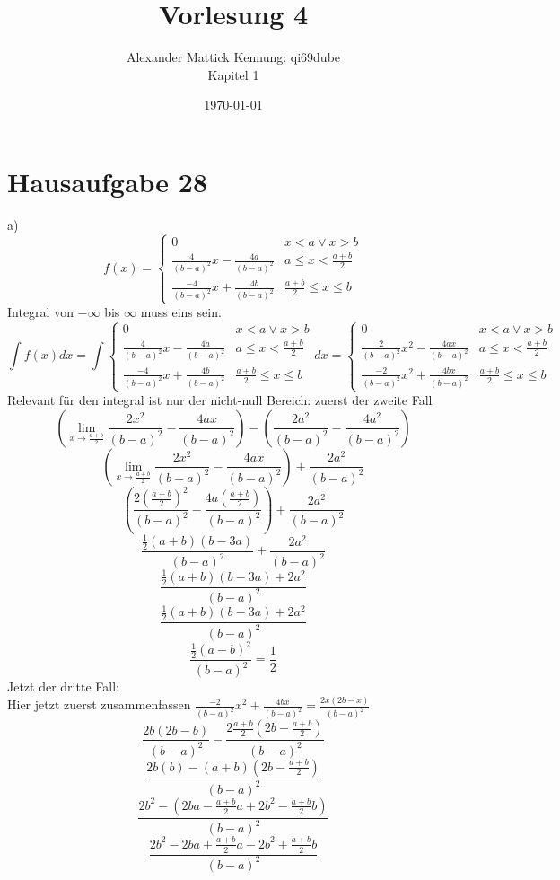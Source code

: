 \documentclass{article}
\author{
Alexander Mattick Kennung: qi69dube\\
Kapitel 1
}
\date{\today}
\title{Vorlesung 4}
\begin{document}
	\maketitle
	\section{Hausaufgabe 28}
	a)\\
	\[f(x)=\begin{cases}0&x<a\lor x>b\\\frac{4}{(b-a)^2}x-\frac{4a}{(b-a)^2}&a\leq x<\frac{a+b}{2}\\ \frac{-4}{(b-a)^2}x+\frac{4b}{(b-a)^2}&\frac{a+b}{2}\leq x\leq b\end{cases}\]
	Integral von $-\infty$ bis $\infty$ muss eins sein.\\
	\[\int f(x)dx = \int\begin{cases}0&x<a\lor x>b\\\frac{4}{(b-a)^2}x-\frac{4a}{(b-a)^2}&a\leq x<\frac{a+b}{2}\\ \frac{-4}{(b-a)^2}x+\frac{4b}{(b-a)^2}&\frac{a+b}{2}\leq x\leq b\end{cases} dx = \begin{cases}0&x<a\lor x>b\\\frac{2}{(b-a)^2}x^2-\frac{4ax}{(b-a)^2}&a\leq x<\frac{a+b}{2}\\ \frac{-2}{(b-a)^2}x^2+\frac{4bx}{(b-a)^2}&\frac{a+b}{2}\leq x\leq b\end{cases}\]
	Relevant für den integral ist nur der nicht-null Bereich: zuerst der zweite Fall\\
	$$(\lim\limits_{x\to\frac{a+b}{2}}\frac{2x^2}{(b-a)^2}-\frac{4ax}{(b-a)^2})-(\frac{2a^2}{(b-a)^2}-\frac{4a^2}{(b-a)^2})$$
	$$(\lim\limits_{x\to\frac{a+b}{2}}\frac{2x^2}{(b-a)^2}-\frac{4ax}{(b-a)^2})+\frac{2a^2}{(b-a)^2}$$
	$$(\frac{2(\frac{a+b}{2})^2}{(b-a)^2}-\frac{4a(\frac{a+b}{2})}{(b-a)^2})+\frac{2a^2}{(b-a)^2}$$
	$$\frac{\frac{1}{2}(a+b)(b-3a)}{(b-a)^2}+\frac{2a^2}{(b-a)^2}$$
	$$\frac{\frac{1}{2}(a+b)(b-3a)+2a^2}{(b-a)^2}$$
	$$\frac{\frac{1}{2}(a+b)(b-3a)+2a^2}{(b-a)^2}$$
	$$\frac{\frac{1}{2}(a-b)^2}{(b-a)^2}=\frac{1}{2}$$
	Jetzt der dritte Fall:\\
	Hier jetzt zuerst zusammenfassen $\frac{-2}{(b-a)^2}x^2+\frac{4bx}{(b-a)^2}= \frac{2x(2b-x)}{(b-a)^2}$\\
	$$\frac{2b(2b-b)}{(b-a)^2}-\frac{2\frac{a+b}{2}(2b-\frac{a+b}{2})}{(b-a)^2}$$
	$$\frac{2b(b)-(a+b)(2b-\frac{a+b}{2})}{(b-a)^2}$$
	$$\frac{2b^2-(2ba-\frac{a+b}{2}a+2b^2-\frac{a+b}{2}b)}{(b-a)^2}$$
	$$\frac{2b^2-2ba+\frac{a+b}{2}a-2b^2+\frac{a+b}{2}b}{(b-a)^2}$$
\end{document}
